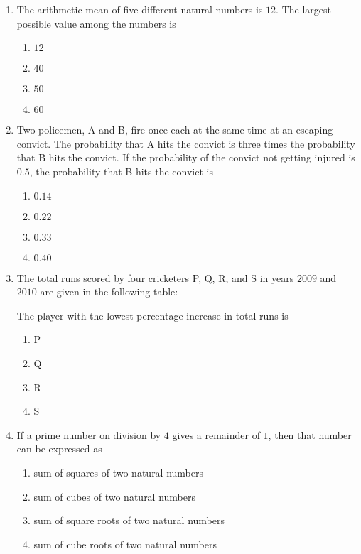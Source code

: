 \documentclass[journal,12pt,twocolumn]{IEEEtran}
\theoremstyle{remark}
\begin{document}
\begin{enumerate}[start=53]
    \item The arithmetic mean of five different natural numbers is $12$. The largest possible value among the numbers is
    \begin{enumerate}
        \item $12$
        \item $40$
        \item $50$
        \item $60$
    \end{enumerate}

    \item Two policemen, A and B, fire once each at the same time at an escaping convict. The probability that A hits the convict is three times the probability that B hits the convict. If the probability of the convict not getting injured is $0.5$, the probability that B hits the convict is
    \begin{enumerate}
        \item $0.14$
        \item $0.22$
        \item $0.33$
        \item $0.40$
    \end{enumerate}

    \item The total runs scored by four cricketers P, Q, R, and S in years $2009$ and $2010$ are given in the following table:
    
    

    The player with the lowest percentage increase in total runs is
    \begin{enumerate}
        \item P
        \item Q
        \item R
        \item S
    \end{enumerate}

    \item If a prime number on division by $4$ gives a remainder of $1$, then that number can be expressed as
    \begin{enumerate}
        \item sum of squares of two natural numbers
        \item sum of cubes of two natural numbers
        \item sum of square roots of two natural numbers
        \item sum of cube roots of two natural numbers
    \end{enumerate}


\end{enumerate}
\end{document}

